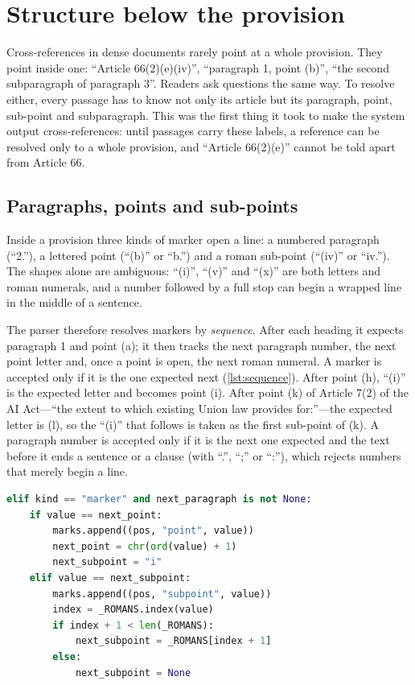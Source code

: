 \section{Structure below the provision}
\label{sec:structure}

Cross-references in dense documents rarely point at a whole provision. They
point inside one: ``Article 66(2)(e)(iv)'', ``paragraph 1, point (b)'', ``the
second subparagraph of paragraph 3''. Readers ask questions the same way. To
resolve either, every passage has to know not only its article but its
paragraph, point, sub-point and subparagraph. This was the first thing it took
to make the system output cross-references: until passages carry these labels,
a reference can be resolved only to a whole provision, and ``Article 66(2)(e)''
cannot be told apart from Article 66.

\subsection{Paragraphs, points and sub-points}

Inside a provision three kinds of marker open a line: a numbered paragraph
(``2.''), a lettered point (``(b)'' or ``b.'') and a roman sub-point (``(iv)''
or ``iv.''). The shapes alone are ambiguous: ``(i)'', ``(v)'' and ``(x)'' are
both letters and roman numerals, and a number followed by a full stop can begin
a wrapped line in the middle of a sentence.

The parser therefore resolves markers by \emph{sequence}. After each heading it
expects paragraph 1 and point (a); it then tracks the next paragraph number,
the next point letter and, once a point is open, the next roman numeral. A
marker is accepted only if it is the one expected next (\cref{lst:sequence}).
After point (h), ``(i)'' is the expected letter and becomes point (i). After
point (k) of Article 7(2) of the AI Act---``the extent to which existing Union
law provides for:''---the expected letter is (l), so the ``(i)'' that follows
is taken as the first sub-point of (k). A paragraph number is accepted only if
it is the next one expected and the text before it ends a sentence or a clause
(with ``.'', ``;'' or ``:''), which rejects numbers that merely begin a line.

\begin{lstlisting}[float, language=Python, caption={Accepting a point or sub-point
only in sequence (\texttt{ingestion/structure.py}, abridged).},
label={lst:sequence}]
elif kind == "marker" and next_paragraph is not None:
    if value == next_point:
        marks.append((pos, "point", value))
        next_point = chr(ord(value) + 1)
        next_subpoint = "i"
    elif value == next_subpoint:
        marks.append((pos, "subpoint", value))
        index = _ROMANS.index(value)
        if index + 1 < len(_ROMANS):
            next_subpoint = _ROMANS[index + 1]
        else:
            next_subpoint = None
\end{lstlisting}

